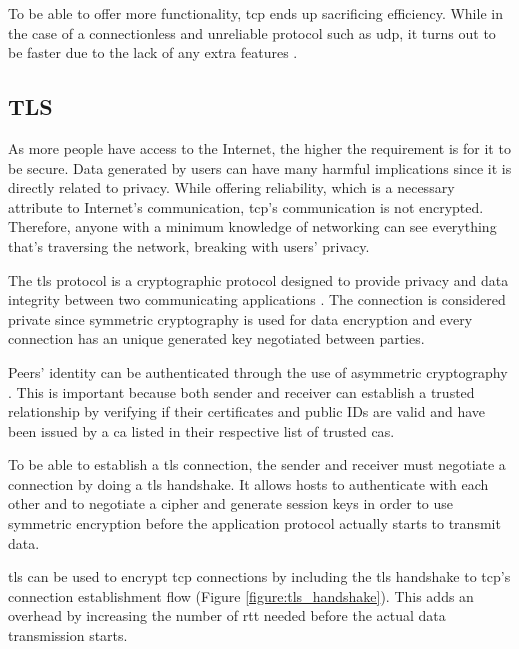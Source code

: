 To be able to offer more functionality, \gls{tcp} ends up sacrificing efficiency. While in the case of a connectionless and unreliable protocol such as \gls{udp}, it turns out to be faster due to the lack of any extra features \cite{tcp_udp_comparison}.

\subsection{TLS}

As more people have access to the Internet, the higher the requirement is for it to be secure. Data generated by users can have many harmful implications since it is directly related to privacy. While offering reliability, which is a necessary attribute to Internet’s communication, \gls{tcp}’s communication is not encrypted. Therefore, anyone with a minimum knowledge of networking can see everything that’s traversing the network, breaking with users' privacy.

The \gls{tls} protocol is a cryptographic protocol designed to provide privacy and data integrity between two communicating applications \cite{rfc5246}. The connection is considered private since symmetric cryptography is used for data encryption and every connection has an unique generated key negotiated between parties.

Peers' identity can be authenticated through the use of asymmetric cryptography \cite{auto_verification_tls_handshake}. This is important because both sender and receiver can establish a trusted relationship by verifying if their certificates and public IDs are valid and have been issued by a \gls{ca} listed in their respective list of trusted \gls{ca}s.

To be able to establish a \gls{tls} connection, the sender and receiver must negotiate a connection by doing a \gls{tls} handshake. It allows hosts to authenticate with each other and to negotiate a cipher and generate session keys in order to use symmetric encryption before the application protocol actually starts to transmit data.

\gls{tls} can be used to encrypt \gls{tcp} connections by including the \gls{tls} handshake to \gls{tcp}’s connection establishment flow (Figure \ref{figure:tls_handshake}). This adds an overhead by increasing the number of \gls{rtt} needed before the actual data transmission starts.

